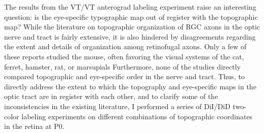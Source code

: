The results from the VT/VT anterograd labeling experiment raise an interesting question: is the eye-specific typographic map out of register with the topographic map?
While the literature on topographic organization of RGC axons in the optic nerve and tract is fairly extensive, it is also hindered by disagreements regarding the extent and details of organization among retinofugal axons.
Only a few of these reports studied the mouse, often favoring the visual systems of the cat, ferret, hamster, rat, or marsupials
Furthermore, none of the studies directly compared topographic and eye-specific order in the nerve and tract.
Thus, to directly address the extent to which the topography and eye-specific maps in the optic tract are in register with each other, and to clarify some of the inconsistencies in the existing literature, I performed a series of DiI/DiD two-color labeling experiments on different combinations of topographic coordinates in the retina at P0.

